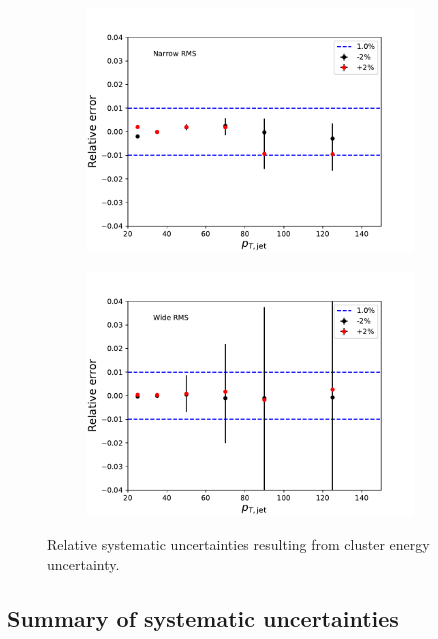 \begin{figure}
\centering
\begin{subfigure}{0.45\textwidth}
\includegraphics[width=0.95\textwidth]{figures/systematics/SystematicErrorsGausRMS_Emcal.pdf}
\end{subfigure}
\begin{subfigure}{0.45\textwidth}
\includegraphics[width=0.95\textwidth]{figures/systematics/SystematicErrorsGammaRMS_Emcal.pdf}
\end{subfigure}
\caption{Relative systematic uncertainties resulting from cluster energy uncertainty.}
\label{fig:systemcal2}
\end{figure}


\FloatBarrier
\subsection{Summary of systematic uncertainties}

